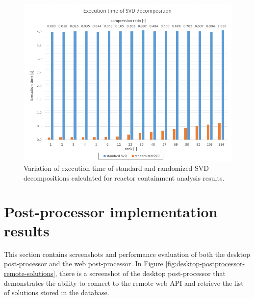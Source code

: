 \begin{figure}[H]
\centering
\includegraphics[width=\textwidth]{figures/chapter-SVD/temelin_ExecutionTime}
\decoRule
\caption[Execution time of standard and randomized SVD decompositions.]{Variation of execution time of standard and randomized SVD decompositions calculated for reactor containment analysis results.}
\label{fig:temelin:ExeTime}
\end{figure}

\section{Post-processor implementation results}


This section contains screenshots and performance evaluation of both the desktop post-processor and the web post-processor. In Figure \ref{fig:desktop-postprocessor-remote-solutions}, there is a screenshot of the desktop post-processor that demonstrates the ability to connect to the remote web API and retrieve the list of solutions stored in the database.

